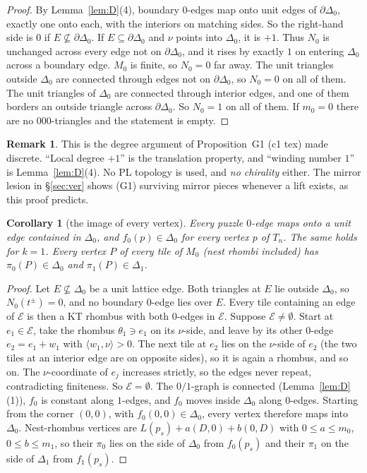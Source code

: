 \documentclass[11pt]{article}
\newtheorem{corollary}[theorem]{Corollary}
\theoremstyle{definition}\newtheorem{definition}[theorem]{Definition}\newtheorem{remark}[theorem]{Remark}
\begin{document}
\begin{proof}
By Lemma~\ref{lem:D}(4), boundary $0$-edges map onto unit edges of $\partial\Delta_0$, exactly one onto each, with the interiors on matching sides. So the right-hand side is $0$ if $E\not\subseteq\partial\Delta_0$. If $E\subseteq\partial\Delta_0$ and $\nu$ points into $\Delta_0$, it is $+1$. Thus $N_0$ is unchanged across every edge not on $\partial\Delta_0$, and it rises by exactly $1$ on entering $\Delta_0$ across a boundary edge. $M_0$ is finite, so $N_0=0$ far away. The unit triangles outside $\Delta_0$ are connected through edges not on $\partial\Delta_0$, so $N_0=0$ on all of them. The unit triangles of $\Delta_0$ are connected through interior edges, and one of them borders an outside triangle across $\partial\Delta_0$. So $N_0=1$ on all of them. If $m_0=0$ there are no $000$-triangles and the statement is empty.
\end{proof}
\begin{remark}
This is the degree argument of Proposition~G1 (c1 tex) made discrete. ``Local degree $+1$'' is the translation property, and ``winding number $1$'' is Lemma~\ref{lem:D}(4). No PL topology is used, and \emph{no chirality} either. The mirror lesion in \S\ref{sec:ver} shows (G1) surviving mirror pieces whenever a lift exists, as this proof predicts.
\end{remark}

\begin{corollary}[the image of every vertex]\label{cor:img}
Every puzzle $0$-edge maps onto a unit edge contained in $\Delta_0$, and $f_0(p)\in\Delta_0$ for every vertex $p$ of $T_n$. The same holds for $k=1$. Every vertex $P$ of every tile of $M_0$ (nest rhombi included) has $\pi_0(P)\in\Delta_0$ and $\pi_1(P)\in\Delta_1$.
\end{corollary}
\begin{proof}
Let $E\not\subseteq\Delta_0$ be a unit lattice edge. Both triangles at $E$ lie outside $\Delta_0$, so $N_0(t^\pm)=0$, and no boundary $0$-edge lies over $E$. Every tile containing an edge of $\mathcal E$ is then a KT rhombus with both $0$-edges in $\mathcal E$. Suppose $\mathcal E\ne\emptyset$. Start at $e_1\in\mathcal E$, take the rhombus $\theta_1\ni e_1$ on its $\nu$-side, and leave by its other $0$-edge $e_2=e_1+w_1$ with $\langle w_1,\nu\rangle>0$. The next tile at $e_2$ lies on the $\nu$-side of $e_2$ (the two tiles at an interior edge are on opposite sides), so it is again a rhombus, and so on. The $\nu$-coordinate of $e_j$ increases strictly, so the edges never repeat, contradicting finiteness. So $\mathcal E=\emptyset$. The $0/1$-graph is connected (Lemma~\ref{lem:D}(1)), $f_0$ is constant along $1$-edges, and $f_0$ moves inside $\Delta_0$ along $0$-edges. Starting from the corner $(0,0)$, with $f_0(0,0)\in\Delta_0$, every vertex therefore maps into $\Delta_0$. Nest-rhombus vertices are $L(p_s)+a(D,0)+b(0,D)$ with $0\le a\le m_0$, $0\le b\le m_1$, so their $\pi_0$ lies on the side of $\Delta_0$ from $f_0(p_s)$ and their $\pi_1$ on the side of $\Delta_1$ from $f_1(p_s)$.
\end{proof}
\end{document}
